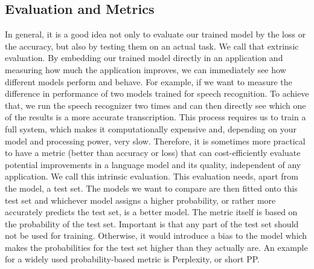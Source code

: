 \subsection{Evaluation and Metrics}
In general, it is a good idea not only to evaluate our trained model by the loss or the accuracy, but also by testing them on an actual task. We call that extrinsic evaluation. By embedding our trained model directly in an application and measuring how much the application improves, we can immediately see how different models perform and behave. For example, if we want to measure the difference in performance of two models trained for speech recognition. To achieve that, we run the speech recognizer two times and can then directly see which one of the results is a more accurate transcription. This process requires us to train a full system, which makes it computationally expensive and, depending on your model and processing power, very slow. Therefore, it is sometimes more practical to have a metric (better than accuracy or loss) that can cost-efficiently evaluate potential improvements in a language model and its quality, independent of any application. We call this intrinsic evaluation. This evaluation needs, apart from the model, a test set. The models we want to compare are then fitted onto this test set and whichever model assigns a higher probability, or rather more accurately predicts the test set, is a better model. The metric itself is based on the probability of the test set. Important is that any part of the test set should not be used for training. Otherwise, it would introduce a bias to the model which makes the probabilities for the test set higher than they actually are. An example for a widely used probability-based metric is Perplexity, or short PP. \cite{slp3}

